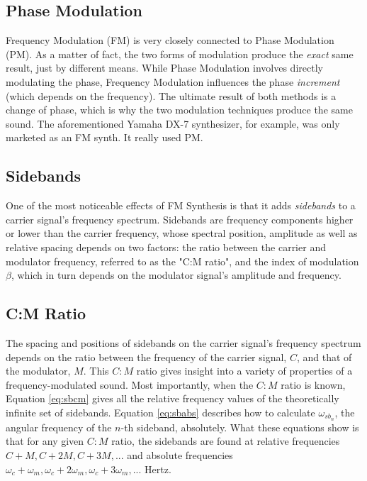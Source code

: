 \documentclass[12pt,twoside]{report}
\begin{document}
\subsection{Phase Modulation}

Frequency Modulation (FM) is very closely connected to Phase Modulation (PM). As a matter of fact, the two forms of modulation produce the \emph{exact} same result, just by different means. While Phase Modulation involves directly modulating the phase, Frequency Modulation influences the phase \emph{increment} (which depends on the frequency). The ultimate result of both methods is a change of phase, which is why the two modulation techniques produce the same sound. The aforementioned Yamaha DX-7 synthesizer, for example, was only marketed as an FM synth. It really used PM.

\subsection{Sidebands}

One of the most noticeable effects of FM Synthesis is that it adds \emph{sidebands} to a carrier signal's frequency spectrum. Sidebands are frequency components higher or lower than the carrier frequency, whose spectral position, amplitude as well as relative spacing depends on two factors: the ratio between the carrier and modulator frequency, referred to as the "C:M ratio", and the index of modulation $\beta$, which in turn depends on the modulator signal's amplitude and frequency.

\subsection{C:M Ratio}

The spacing and positions of sidebands on the carrier signal's frequency spectrum depends on the ratio between the frequency of the carrier signal, $C$, and that of the modulator, $M$. This $C:M$ ratio gives insight into a variety of properties of a frequency-modulated sound. Most importantly, when the $C:M$ ratio is known, Equation \ref{eq:sbcm} gives all the relative frequency values of the theoretically infinite set of sidebands. Equation \ref{eq:sbabs} describes how to calculate $\omega_{sb_{n}}$, the angular frequency of the $n$-th sideband, absolutely. What these equations show is that for any given $C:M$ ratio, the sidebands are found at relative frequencies $C + M, C + 2M, C + 3M, ... $ and absolute frequencies %
$\omega_{c} + \omega_{m}, \omega_{c} + 2 \omega_{m},\omega_{c} + 3 \omega_{m}, ...$ Hertz.
\end{document}
